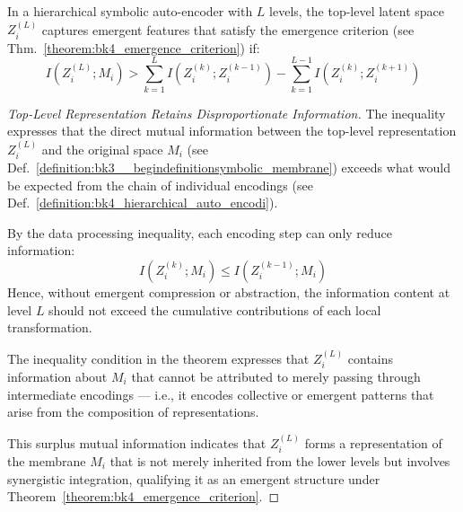 \begin{theorem} \label{theorem:bk4_emergent_abstraction}
In a hierarchical symbolic auto-encoder with $L$ levels, the top-level latent space $Z_i^{(L)}$ captures emergent features that satisfy the emergence criterion (see Thm.~\ref{theorem:bk4_emergence_criterion}) if:
\begin{equation}
    I(Z_i^{(L)}; M_i) > \sum_{k=1}^{L} I(Z_i^{(k)}; Z_i^{(k-1)}) - \sum_{k=1}^{L-1} I(Z_i^{(k)}; Z_i^{(k+1)})
\end{equation}
\end{theorem}

\begin{proof}[Top-Level Representation Retains Disproportionate Information]
\label{proof:bk4_top_level_information_inequality}
The inequality expresses that the direct mutual information between the top-level representation $Z_i^{(L)}$ and the original space $M_i$ (see Def.~\ref{definition:bk3__begindefinitionsymbolic_membrane}) exceeds what would be expected from the chain of individual encodings (see Def.~\ref{definition:bk4_hierarchical_auto_encodi}).

By the data processing inequality, each encoding step can only reduce information:
\begin{equation}
    I(Z_i^{(k)}; M_i) \leq I(Z_i^{(k-1)}; M_i)
\end{equation}
Hence, without emergent compression or abstraction, the information content at level $L$ should not exceed the cumulative contributions of each local transformation.

The inequality condition in the theorem expresses that $Z_i^{(L)}$ contains information about $M_i$ that cannot be attributed to merely passing through intermediate encodings — i.e., it encodes collective or emergent patterns that arise from the composition of representations.

This surplus mutual information indicates that $Z_i^{(L)}$ forms a representation of the membrane $M_i$ that is not merely inherited from the lower levels but involves synergistic integration, qualifying it as an emergent structure under Theorem~\ref{theorem:bk4_emergence_criterion}.
\end{proof}
